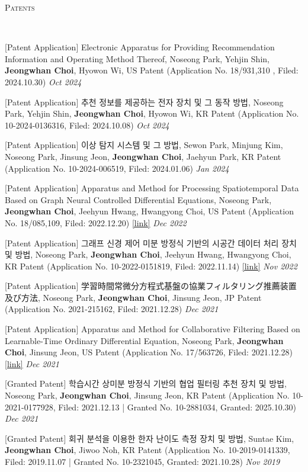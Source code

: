 \documentclass[10pt]{article}
\newenvironment{changemargin}[2]{
  \begin{list}{}{
    \setlength{\topsep}{0pt}
    \setlength{\leftmargin}{#1}
    \setlength{\rightmargin}{#2}
    \setlength{\listparindent}{\parindent}
    \setlength{\itemindent}{\parindent}
    \setlength{\parsep}{\parskip}
  }
  \item[]}{\end{list}
}
\newcommand{\lineover}{
	\begin{changemargin}{-0.05in}{-0.05in}
		\vspace*{-8pt}
		\hrulefill \\
		\vspace*{-2pt}
	\end{changemargin}
}
\newcommand{\header}[1]{
	\begin{changemargin}{-0.5in}{-0.5in}
		\scshape{#1}\\
  	\lineover
	\end{changemargin}
}
\newcommand{\presentation}[2]{
	{#1} \hfill \emph{#2}\\ \bigskip
}
\newenvironment{body} {
	\vspace*{-16pt}
	\begin{changemargin}{-0.25in}{-0.5in}
  }
	{\end{changemargin}
}
\begin{document}
\medskip

\header{Patents}

\begin{body}
	\vspace{14pt}

\presentation{[Patent Application] Electronic Apparatus for Providing Recommendation Information and Operating Method Thereof, Noseong Park, Yehjin Shin, \textbf{Jeongwhan Choi}, Hyowon Wi, US Patent (Application No. 18/931,310 , Filed: 2024.10.30)}{Oct 2024}	
	
\presentation{[Patent Application] 추천 정보를 제공하는 전자 장치 및 그 동작 방법, Noseong Park, Yehjin Shin, \textbf{Jeongwhan Choi}, Hyowon Wi, KR Patent (Application No. 10-2024-0136316, Filed: 2024.10.08)}{Oct 2024}	


\presentation{[Patent Application] 이상 탐지 시스템 및 그 방법, Sewon Park, Minjung Kim, Noseong Park, Jinsung Jeon, \textbf{Jeongwhan Choi}, Jaehyun Park, KR Patent (Application No. 10-2024-006519, Filed: 2024.01.06) }{Jan 2024}

\presentation{[Patent Application] Apparatus and Method for Processing Spatiotemporal Data Based on Graph Neural Controlled Differential Equations, Noseong Park, \textbf{Jeongwhan Choi}, Jeehyun Hwang, Hwangyong Choi, US Patent (Application No. 18/085,109, Filed: 2022.12.20) \href{https://patents.google.com/patent/US20230186105A1/en}{[link]}}{Dec 2022}	

\presentation{[Patent Application] 그래프 신경 제어 미분 방정식 기반의 시공간 데이터 처리 장치 및 방법, Noseong Park, \textbf{Jeongwhan Choi}, Jeehyun Hwang, Hwangyong Choi, KR Patent (Application No. 10-2022-0151819, Filed: 2022.11.14) \href{https://patents.google.com/patent/KR20240073179A/en}{[link]}}{Nov 2022}

\presentation{[Patent Application] 学習時間常微分方程式基盤の協業フィルタリング推薦装置及び方法, Noseong Park, \textbf{Jeongwhan Choi}, Jinsung Jeon, JP Patent (Application No. 2021-215162, Filed: 2021.12.28)}{Dec 2021}	

\presentation{[Patent Application] Apparatus and Method for Collaborative Filtering Based on Learnable-Time Ordinary Differential Equation, Noseong Park, \textbf{Jeongwhan Choi}, Jinsung Jeon, US Patent (Application No. 17/563726, Filed: 2021.12.28) \href{https://patents.google.com/patent/US20230186105A1/en}{[link]}}{Dec 2021}	

\presentation{[Granted Patent] 학습시간 상미분 방정식 기반의 협업 필터링 추천 장치 및 방법, Noseong Park, \textbf{Jeongwhan Choi}, Jinsung Jeon, KR Patent (Application No. 10-2021-0177928, Filed: 2021.12.13 | Granted No. 10-2881034, Granted: 2025.10.30)}{Dec 2021}

\presentation{[Granted Patent] 회귀 분석을 이용한 한자 난이도 측정 장치 및 방법, Suntae Kim, \textbf{Jeongwhan Choi}, Jiwoo Noh, KR Patent (Application No. 10-2019-0141339, Filed: 2019.11.07 | Granted No. 10-2321045, Granted: 2021.10.28) }{Nov 2019}	
\end{body}
    
\end{document}
